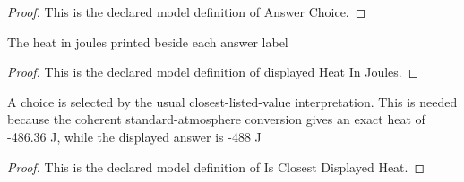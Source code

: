 \begin{proof}
  This is the declared model definition of Answer Choice.
\end{proof}
\begin{definition}
  \label{def:physics:phyx-mini-0411:phyxminiproblems-problemphyxmini0411-displayedheatinjoules}
  The heat in joules printed beside each answer label
\end{definition}
\begin{proof}
  This is the declared model definition of displayed Heat In Joules.
\end{proof}
\begin{definition}
  \label{def:physics:phyx-mini-0411:phyxminiproblems-problemphyxmini0411-isclosestdisplayedheat}
  A choice is selected by the usual closest-listed-value interpretation. This is needed because the coherent standard-atmosphere conversion gives an exact heat of -486.36 J, while the displayed answer is -488 J
\end{definition}
\begin{proof}
  This is the declared model definition of Is Closest Displayed Heat.
\end{proof}
